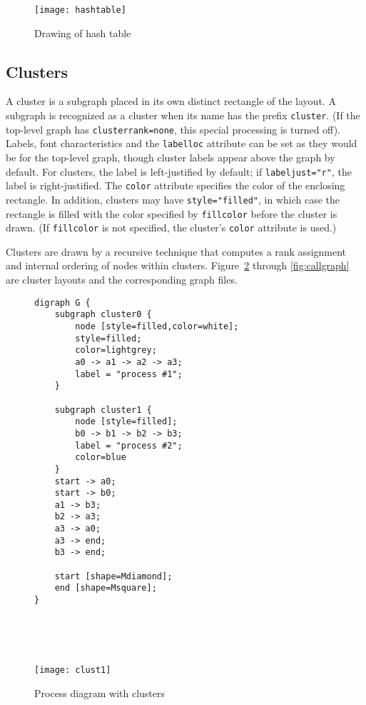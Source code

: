 \documentclass[11pt]{article}
\begin{document}
\begin{figure}[p]
	\centerline {
		\texttt{[image: hashtable]}
	}
    \caption{Drawing of hash table}
    \label{fig:hashtabledrawing}
\end{figure}

\subsection{Clusters}

A cluster is a subgraph placed in its own distinct rectangle of the layout.
A subgraph is recognized as a cluster when its name has the prefix
\verb"cluster". (If the top-level graph has {\tt clusterrank=none},
this special processing is turned off).
Labels, font characteristics and the {\tt labelloc} attribute can 
be set as they would be for the top-level graph, though
cluster labels appear above the graph by default. 
For clusters, the label is left-justified by default;
if {\tt labeljust="r"}, the label is right-justified.
The {\tt color} attribute specifies the color of the enclosing rectangle.
In addition, clusters may have {\tt style="filled"}, in which case
the rectangle is filled with the color specified by {\tt fillcolor}
before the cluster is drawn. (If  {\tt fillcolor} is not specified,
the cluster's {\tt color} attribute is used.)

Clusters are drawn by a recursive technique that computes a
rank assignment and internal ordering of nodes within clusters.
Figure~\ref{fig:clust1} through \ref{fig:callgraph} are cluster layouts
and the corresponding graph files.

\begin{figure}[p]
\begin{minipage}[t]{2.5in}
\footnotesize
\begin{verbatim}
digraph G {
    subgraph cluster0 {
        node [style=filled,color=white];
        style=filled;
        color=lightgrey;
        a0 -> a1 -> a2 -> a3;
        label = "process #1";
    }

    subgraph cluster1 {
        node [style=filled];
        b0 -> b1 -> b2 -> b3;
        label = "process #2";
        color=blue
    }
    start -> a0;
    start -> b0;
    a1 -> b3;
    b2 -> a3;
    a3 -> a0;
    a3 -> end;
    b3 -> end;

    start [shape=Mdiamond];
    end [shape=Msquare];
}
\end{verbatim}
\end{minipage} \hspace{0.05in} \
\parbox[t]{2.0in}{
    \ \\
	\centerline {
		\texttt{[image: clust1]}
	}
}
    \caption{Process diagram with clusters}
    \label{fig:clust1}
\end{figure}
\clearpage
\end{document}
